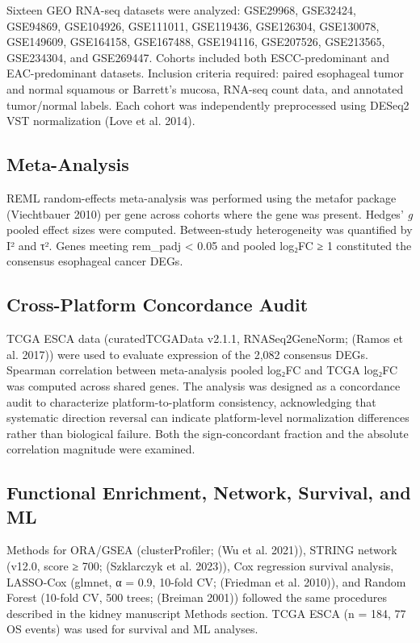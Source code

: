 \documentclass[
  12pt,
]{article}
\begin{document}
Sixteen GEO RNA-seq datasets were analyzed: GSE29968, GSE32424,
GSE94869, GSE104926, GSE111011, GSE119436, GSE126304, GSE130078,
GSE149609, GSE164158, GSE167488, GSE194116, GSE207526, GSE213565,
GSE234304, and GSE269447. Cohorts included both ESCC-predominant and
EAC-predominant datasets. Inclusion criteria required: paired esophageal
tumor and normal squamous or Barrett's mucosa, RNA-seq count data, and
annotated tumor/normal labels. Each cohort was independently
preprocessed using DESeq2 VST normalization (Love et al. 2014).

\subsection{Meta-Analysis}\label{meta-analysis}

REML random-effects meta-analysis was performed using the metafor
package (Viechtbauer 2010) per gene across cohorts where the gene was
present. Hedges' \emph{g} pooled effect sizes were computed.
Between-study heterogeneity was quantified by I² and τ². Genes meeting
rem\_padj \textless{} 0.05 and \textbar pooled log₂FC\textbar{} ≥ 1
constituted the consensus esophageal cancer DEGs.

\subsection{Cross-Platform Concordance
Audit}\label{cross-platform-concordance-audit}

TCGA ESCA data (curatedTCGAData v2.1.1, RNASeq2GeneNorm; (Ramos et al.
2017)) were used to evaluate expression of the 2,082 consensus DEGs.
Spearman correlation between meta-analysis pooled log₂FC and TCGA log₂FC
was computed across shared genes. The analysis was designed as a
concordance audit to characterize platform-to-platform consistency,
acknowledging that systematic direction reversal can indicate
platform-level normalization differences rather than biological failure.
Both the sign-concordant fraction and the absolute correlation magnitude
were examined.

\subsection{Functional Enrichment, Network, Survival, and
ML}\label{functional-enrichment-network-survival-and-ml}

Methods for ORA/GSEA (clusterProfiler; (Wu et al. 2021)), STRING network
(v12.0, score ≥ 700; (Szklarczyk et al. 2023)), Cox regression survival
analysis, LASSO-Cox (glmnet, α = 0.9, 10-fold CV; (Friedman et al.
2010)), and Random Forest (10-fold CV, 500 trees; (Breiman 2001))
followed the same procedures described in the kidney manuscript Methods
section. TCGA ESCA (n = 184, 77 OS events) was used for survival and ML
analyses.
\end{document}
